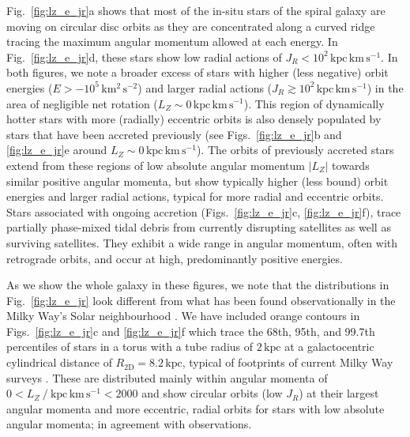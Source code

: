 \documentclass[fleqn,usenatbib]{mnras}
\begin{document}
Fig.~\ref{fig:lz_e_jr}a shows that most of the in-situ stars of the spiral galaxy are moving on circular disc orbits as they are concentrated along a curved ridge tracing the maximum angular momentum allowed at each energy. In Fig.~\ref{fig:lz_e_jr}d, these stars show low radial actions of $J_R < 10^2\,\mathrm{kpc\,km\,s^{-1}}$. In both figures, we note a broader excess of stars with higher (less negative) orbit energies ($E > -10^5\,\mathrm{km^2\,s^{-2}}$) and larger radial actions ($J_R \gtrsim 10^2\,\mathrm{kpc\,km\,s^{-1}}$) in the area of negligible net rotation ($L_Z \sim 0\,\mathrm{kpc\,km\,s^{-1}}$). This region of dynamically hotter stars with more (radially) eccentric orbits is also densely populated by stars that have been accreted previously (see Figs.~\ref{fig:lz_e_jr}b and \ref{fig:lz_e_jr}e around $L_Z \sim 0\,\mathrm{kpc\,km\,s^{-1}}$). The orbits of previously accreted stars extend from these regions of low absolute angular momentum $\vert L_Z\vert$ towards similar positive angular momenta, but show typically higher (less bound) orbit energies and larger radial actions, typical for more radial and eccentric orbits. Stars associated with ongoing accretion (Figs.~\ref{fig:lz_e_jr}c, \ref{fig:lz_e_jr}f), trace partially phase-mixed tidal debris from currently disrupting satellites as well as surviving satellites. They exhibit a wide range in angular momentum, often with retrograde orbits, and occur at high, predominantly positive energies.

As we show the whole galaxy in these figures, we note that the distributions in Fig.~\ref{fig:lz_e_jr} look different from what has been found observationally in the Milky Way's Solar neighbourhood \citep[see for example][]{Helmi2018,Trick2019,Das2020,Buder2022}. We have included orange contours in Figs.~\ref{fig:lz_e_jr}c and \ref{fig:lz_e_jr}f which trace the 68th, 95th, and 99.7th percentiles of stars in a torus with a tube radius of $2\,\mathrm{kpc}$ at a galactocentric cylindrical distance of $R_\mathrm{2D} = 8.2\,\mathrm{kpc}$, typical of footprints of current Milky Way surveys \citep[for example][]{SDSSDR17, Katz2023, Buder2025}. These are distributed mainly within angular momenta of $0 < L_Z~/~\mathrm{kpc\,km\,s^{-1}} < 2000$ and show circular orbits (low $J_R$) at their largest angular momenta and more eccentric, radial orbits for stars with low absolute angular momenta; in agreement with observations.
\end{document}
